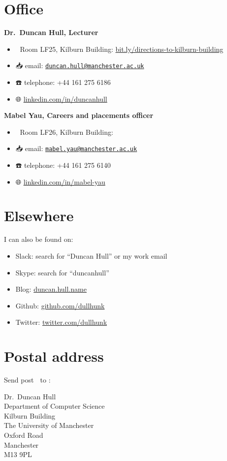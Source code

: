 \documentclass[12pt,]{book}
\providecommand{\tightlist}{%
  \setlength{\itemsep}{0pt}\setlength{\parskip}{0pt}}
\begin{document}
\hypertarget{office}{%
\section{Office}\label{office}}

\textbf{Dr.~Duncan Hull, Lecturer} 👨‍💻

\begin{itemize}
\tightlist
\item
  🏢 Room LF25, Kilburn Building: \href{http://bit.ly/directions-to-kilburn-building}{bit.ly/directions-to-kilburn-building}
\item
  📥 email: \href{mailto:duncan.hull@manchester.ac.uk}{\nolinkurl{duncan.hull@manchester.ac.uk}}
\item
  ☎️ telephone: +44 161 275 6186
\item
  🌐 \href{https://uk.linkedin.com/in/duncanhull}{linkedin.com/in/duncanhull}
\end{itemize}

\textbf{Mabel Yau, Careers and placements officer} 👩‍💻

\begin{itemize}
\tightlist
\item
  🏢 Room LF26, Kilburn Building:
\item
  📥 email: \href{mailto:mabel.yau@manchester.ac.uk}{\nolinkurl{mabel.yau@manchester.ac.uk}}
\item
  ☎️ telephone: +44 161 275 6140
\item
  🌐 \href{https://uk.linkedin.com/in/mabel-yau}{linkedin.com/in/mabel-yau}
\end{itemize}

\hypertarget{elsewhere}{%
\section{Elsewhere}\label{elsewhere}}

I can also be found on:

\begin{itemize}
\tightlist
\item
  Slack: search for ``Duncan Hull'' or my work email
\item
  Skype: search for ``duncanhull''
\item
  Blog: \href{https://duncan.hull.name}{duncan.hull.name}
\item
  Github: \href{https://github.com/dullhunk}{github.com/dullhunk}
\item
  Twitter: \href{https://twitter.com/dullhunk}{twitter.com/dullhunk}
\end{itemize}

\hypertarget{postal-address}{%
\section{Postal address}\label{postal-address}}

Send post 🐌 to :

Dr.~Duncan Hull\\
Department of Computer Science\\
Kilburn Building\\
The University of Manchester\\
Oxford Road\\
Manchester\\
M13 9PL


\end{document}
